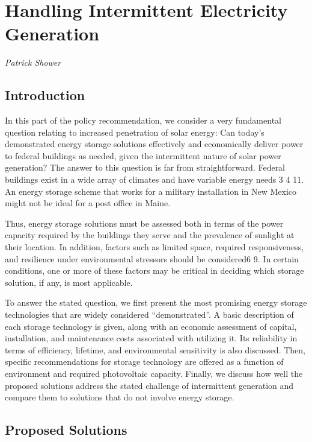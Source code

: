 \section{Handling Intermittent Electricity Generation}
\textit{Patrick Shower}

\subsection{Introduction}

In this part of the policy recommendation, we consider a very fundamental 
question relating to increased penetration of solar energy: Can today’s
demonstrated energy storage solutions effectively and economically deliver
power to federal buildings as needed, given the intermittent nature of solar
power generation? The answer to this question is far from straightforward.
Federal buildings exist in a wide array of climates and have variable energy
needs \cite{patrick}{3} \cite{patrick}{4} \cite{patrick}{11}. An energy storage scheme that works for a military installation in New
Mexico might not be ideal for a post office in Maine. 

Thus, energy storage solutions must be assessed both in terms of the power
capacity required by the buildings they serve and the prevalence of sunlight at
their location. In addition, factors such as limited space, required
responsiveness, and resilience under environmental stressors should be
considered\cite{patrick}{6} \cite{patrick}{9}. In certain conditions, one or more of these factors may be critical
in deciding which storage solution, if any, is most applicable.

To answer the stated question, we first present the most promising energy
storage technologies that are widely considered ``demonstrated''. A basic
description of each storage technology is given, along with an economic
assessment of capital, installation, and maintenance costs associated with utilizing it.
Its reliability in terms of efficiency, lifetime, and environmental sensitivity
is also discussed. Then, specific recommendations for storage technology are
offered as a function of environment and required photovoltaic capacity. Finally, we
discuss how well the proposed solutions address the stated challenge of
intermittent generation and compare them to solutions that do not involve
energy storage.

\subsection{Proposed Solutions}

